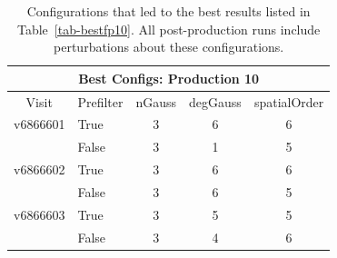 \documentclass[prd, nofootinbib, floatfix, 11pt,tightenlines,times]{article}
\begin{document}

\begin{table}
\centering
\begin{tabular}{clccc}
\hline
\multicolumn{5}{|c|}{Best Configs: Production 10} \\
\hline
Visit    & Prefilter & nGauss & degGauss & spatialOrder \\
\hline
v6866601 & True      & 3      & 6        & 6 \\
         & False     & 3      & 1        & 5 \\
v6866602 & True      & 3      & 6        & 6 \\
         & False     & 3      & 6        & 5 \\
v6866603 & True      & 3      & 5        & 5 \\
         & False     & 3      & 4        & 6 \\
\end{tabular}
\caption{Configurations that led to the best results listed in
  Table~\ref{tab-bestfp10}.  All post-production runs include
  perturbations about these configurations. \label{tab-bestconfig10}}
\end{table}
\end{document}
